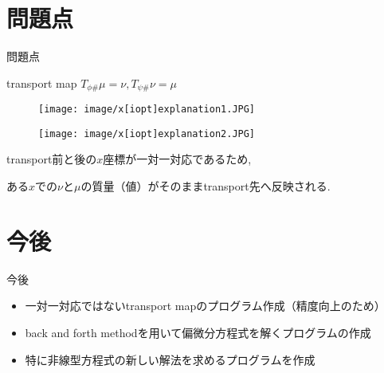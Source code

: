 \documentclass[aspectratio=169, dvipdfmx, 12pt]{beamer}
\begin{document}
\section{問題点}
\begin{frame}{問題点}

    \begin{block}{transport map}
        $T_{\phi \#} \mu = \nu, T_{\psi \#} \nu = \mu$
    \end{block}

    \begin{figure}[htb]
        \begin{center}
            \begin{minipage}{0.40\hsize}
                \texttt{[image: image/x[iopt]explanation1.JPG]}
            \end{minipage}
            \begin{minipage}{0.40\hsize}
                \texttt{[image: image/x[iopt]explanation2.JPG]}
            \end{minipage}
        \end{center}
    \end{figure}
    \label{x[iopt]explanation}

    transport前と後の$x$座標が一対一対応であるため,

    ある$x$での$\nu$と$\mu$の質量（値）がそのままtransport先へ反映される.

\end{frame}

\section{今後}
\begin{frame}{今後}
    \begin{itemize}
        \item 一対一対応ではないtransport mapのプログラム作成（精度向上のため）
        \item back and forth methodを用いて偏微分方程式を解くプログラムの作成
        \item 特に非線型方程式の新しい解法を求めるプログラムを作成
    \end{itemize}

\end{frame}
\end{document}
